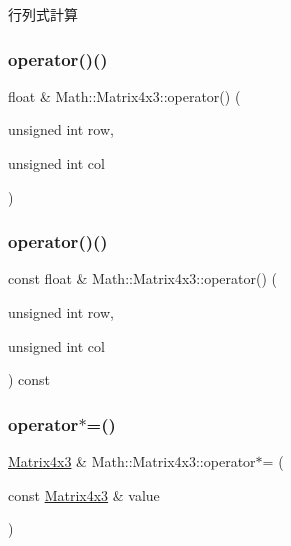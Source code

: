 行列式計算 

\mbox{\label{struct_math_1_1_matrix4x3_ac8d1782be2c7f26865d64d14526a2e40}} 
\subsubsection{\texorpdfstring{operator()()}{operator()()}\hspace{0.1cm}{\footnotesize\ttfamily [1/2]}}
{\footnotesize\ttfamily float \& Math\+::\+Matrix4x3\+::operator() (\begin{DoxyParamCaption}\item[{unsigned int}]{row,  }\item[{unsigned int}]{col }\end{DoxyParamCaption})}

\mbox{\label{struct_math_1_1_matrix4x3_a183465e227b61615c91cf797fade0100}} 
\subsubsection{\texorpdfstring{operator()()}{operator()()}\hspace{0.1cm}{\footnotesize\ttfamily [2/2]}}
{\footnotesize\ttfamily const float \& Math\+::\+Matrix4x3\+::operator() (\begin{DoxyParamCaption}\item[{unsigned int}]{row,  }\item[{unsigned int}]{col }\end{DoxyParamCaption}) const}

\mbox{\label{struct_math_1_1_matrix4x3_a27485d5879ecd028ce4f66363e0a7608}} 
\subsubsection{\texorpdfstring{operator$\ast$=()}{operator*=()}\hspace{0.1cm}{\footnotesize\ttfamily [1/2]}}
{\footnotesize\ttfamily \mbox{\hyperlink{struct_math_1_1_matrix4x3}{Matrix4x3}} \& Math\+::\+Matrix4x3\+::operator$\ast$= (\begin{DoxyParamCaption}\item[{const \mbox{\hyperlink{struct_math_1_1_matrix4x3}{Matrix4x3}} \&}]{value }\end{DoxyParamCaption})}

